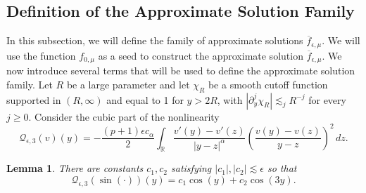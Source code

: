 \documentclass[11pt]{amsart}
\newtheorem{lemma}[theorem]{Lemma}
\theoremstyle{definition}
\theoremstyle{remark}
\numberwithin{equation}{section}
\newcommand{\R}{\mathbb{R}}
\newcommand{\mc}[1]{\mathcal{#1}}
\newcommand{\ov}[1]{\overline{#1}}
\begin{document}
\subsection{Definition of the Approximate Solution Family}\label{sec:approximate_family}

In this subsection, we will define the family of approximate solutions $\ov{f}_{\epsilon, \mu}$. We will use the function $f_{0, \mu}$ as a seed to construct the approximate solution $\ov{f}_{\epsilon, \mu}$. We now introduce several terms that will be used to define the approximate solution family. Let $R$ be a large parameter and let $\chi_R$ be a smooth cutoff function supported in $(R, \infty)$ and equal to 1 for $y > 2R$, with $|\partial_y^j\chi_R|\lesssim_j R^{-j}$ for every $j\geq0$.
Consider the cubic part of the nonlinearity
\[\mc{Q}_{\epsilon,3}(v)(y)
    =-\frac{(p+1)\epsilon c_\alpha}{2}\int_{\R}
    \frac{v'(y)-v'(z)}{|y-z|^\alpha}
    \left(\frac{v(y)-v(z)}{y-z}\right)^2\,dz.\]

\begin{lemma}
    There are constants $c_1, c_2$ satisfying $|c_1|,|c_2| \lesssim \epsilon$ so that 
    \[\mc{Q}_{\epsilon, 3}(\sin(\cdot))(y) = c_1 \cos(y) + c_2 \cos(3y).\]
\end{lemma}
\end{document}

